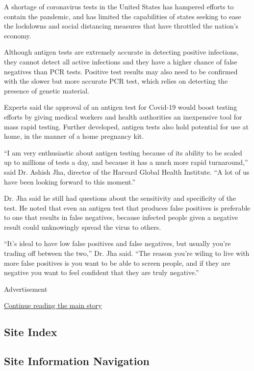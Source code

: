 A shortage of coronavirus tests in the United States has hampered
efforts to contain the pandemic, and has limited the capabilities of
states seeking to ease the lockdowns and social distancing measures that
have throttled the nation's economy.

Although antigen tests are extremely accurate in detecting positive
infections, they cannot detect all active infections and they have a
higher chance of false negatives than PCR tests. Positive test results
may also need to be confirmed with the slower but more accurate PCR
test, which relies on detecting the presence of genetic material.

Experts said the approval of an antigen test for Covid-19 would boost
testing efforts by giving medical workers and health authorities an
inexpensive tool for mass rapid testing. Further developed, antigen
tests also hold potential for use at home, in the manner of a home
pregnancy kit.

``I am very enthusiastic about antigen testing because of its ability to
be scaled up to millions of tests a day, and because it has a much more
rapid turnaround,'' said Dr. Ashish Jha, director of the Harvard Global
Health Institute. ``A lot of us have been looking forward to this
moment.''

Dr. Jha said he still had questions about the sensitivity and
specificity of the test. He noted that even an antigen test that
produces false positives is preferable to one that results in false
negatives, because infected people given a negative result could
unknowingly spread the virus to others.

``It's ideal to have low false positives and false negatives, but
usually you're trading off between the two,'' Dr. Jha said. ``The reason
you're wiling to live with more false positives is you want to be able
to screen people, and if they are negative you want to feel confident
that they are truly negative.''

Advertisement

\protect\hyperlink{after-bottom}{Continue reading the main story}

\hypertarget{site-index}{%
\subsection{Site Index}\label{site-index}}

\hypertarget{site-information-navigation}{%
\subsection{Site Information
Navigation}\label{site-information-navigation}}

